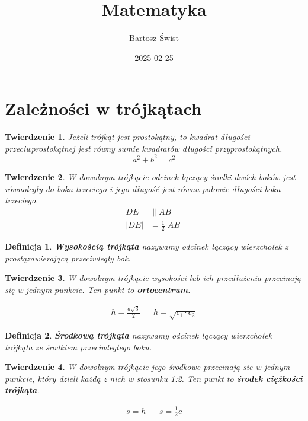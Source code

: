 \documentclass{article}
\title{Matematyka}
\date{2025-02-25}
\author{Bartosz Świst}
\numberwithin{equation}{section}
\newtheorem*{definition}{Definicja}
\newtheorem{theorem}{Twierdzenie}[section]
\begin{document}
  \maketitle
  \newpage

  \section{Zależności w trójkątach}
    \begin{theorem}
      Jeżeli trójkąt jest prostokątny, to kwadrat długości przeciwprostokątnej jest równy sumie kwadratów długości przyprostokątnych.
      \begin{equation}
        a^2 + b^2 = c^2
      \end{equation}
    \end{theorem}
    \begin{theorem}
      W dowolnym trójkącie odcinek łączący środki dwóch boków jest równoległy do boku trzeciego i jego długość jest równa połowie długości boku trzeciego.
      \begin{equation}
        \begin{aligned}
          DE &\parallel AB\\
          |DE| &= \frac 12|AB|
        \end{aligned}
      \end{equation}
    \end{theorem}
    \begin{definition}
      \textbf{Wysokością trójkąta} nazywamy odcinek łączący wierzchołek z prostązawierającą przeciwległy bok.
    \end{definition}
    \begin{theorem}
      W dowolnym trójkącie wysokości lub ich przedłużenia przecinają się w jednym punkcie. Ten punkt to \textbf{ortocentrum}.
    \end{theorem}
    \begin{align}
      h = \frac{a\sqrt3}{2} && h = \sqrt{c_1\cdot c_2}
    \end{align}
    \begin{definition}
      \textbf{Środkową trójkąta} nazywamy odcinek łączący wierzchołek\\ trójkąta ze środkiem przeciwległego boku.
    \end{definition}
    \begin{theorem}
      W dowolnym trójkącie jego środkowe przecinają sie w jednym punkcie, który dzieli każdą z nich w stosunku 1:2. Ten punkt to \textbf{środek ciężkości trójkąta}.
    \end{theorem}
    \begin{align}
      s = h && s = \frac 12c
    \end{align}
\end{document}
